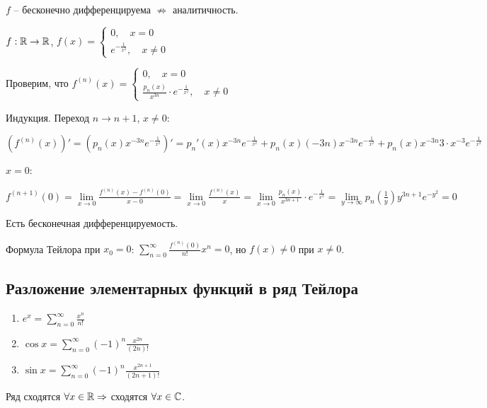 \begin{remark}
    $f$ – бесконечно дифференцируема $\not\Rightarrow$ аналитичность.
\end{remark}

\begin{example}
    $f: \mathbb{R}\rightarrow \mathbb{R}$, $f(x)=\left\{\begin{array}{ll}
         0, \quad x=0 \\ e^{-\frac{1}{x^2}},\quad x\neq 0
    \end{array}\right.$

    Проверим, что $f^{(n)}(x)=\left\{\begin{array}{ll}
         0, \quad x=0 \\ \frac{p_n(x)}{x^{3n}}\cdot e^{-\frac{1}{x^2}},\quad x\neq 0
    \end{array}\right.$

    Индукция. Переход $n\rightarrow n+1$, $x\neq 0$:

    $(f^{(n)}(x))'=(p_n(x)x^{-3n}e^{-\frac{1}{x^2}})'=p_n'(x)x^{-3n}e^{-\frac{1}{x^2}} +p_n(x)(-3n)x^{-3n} e^{-\frac{1}{x^2}} + p_n(x) x^{-3n} 3\cdot x^{-3}e^{-\frac{1}{x^2}}$

    $x=0$:

    $f^{(n+1)}(0)=\lim\limits_{x\rightarrow 0}\frac{f^{(n)}(x)-f^{(n)}(0)}{x-0}=\lim\limits_{x\rightarrow 0} \frac{f^{(n)}(x)}{x} =\lim\limits_{x\rightarrow 0} \frac{p_n(x)}{x^{3n+1}}\cdot e^{-\frac{1}{x^2}} = \lim\limits_{y\rightarrow \infty}p_n(\frac{1}{y})y^{3n+1}e^{-y^2}=0$

    Есть бесконечная дифференцируемость. 
    
    Формула Тейлора при $x_0=0$: $\sum\limits_{n=0}^\infty\frac{f^{(n)}(0)}{n!}x^n=0$, но $f(x)\neq 0$ при $x\neq 0$.
\end{example}

\subsection*{Разложение элементарных функций в ряд Тейлора}
\begin{enumerate}
    \item $e^x=\sum\limits_{n=0}^\infty\frac{x^n}{n!}$
    \item $\cos x=\sum\limits_{n=0}^\infty(-1)^n\frac{x^{2n}}{(2n)!}$
    \item $\sin x=\sum\limits_{n=0}^\infty(-1)^n\frac{x^{2n+1}}{(2n+1)!}$
\end{enumerate}

Ряд сходятся $\forall x\in \mathbb{R}\Rightarrow$ сходятся $\forall x\in \mathbb{C}$.

